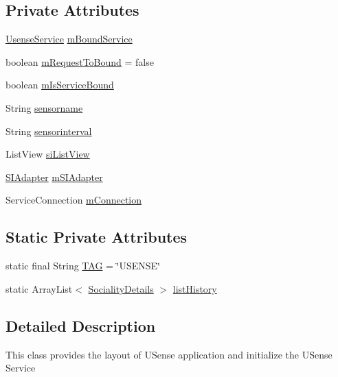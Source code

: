 \subsection*{Private Attributes}
\begin{DoxyCompactItemize}
\item 
\hyperlink{classcs_1_1usense_1_1_usense_service}{Usense\+Service} \hyperlink{classcs_1_1usense_1_1_usense_activity_a85e4dfec4eebe7691d68175af0a102d7}{m\+Bound\+Service}
\item 
boolean \hyperlink{classcs_1_1usense_1_1_usense_activity_a752b7a320a71b54860083dcf3fa53ea2}{m\+Request\+To\+Bound} = false
\item 
boolean \hyperlink{classcs_1_1usense_1_1_usense_activity_afe23746678829a04aa6c82f7d8d6fa71}{m\+Is\+Service\+Bound}
\item 
String \hyperlink{classcs_1_1usense_1_1_usense_activity_a2a4b08f436f712dc28f9be7b02bf62e4}{sensorname}
\item 
String \hyperlink{classcs_1_1usense_1_1_usense_activity_a6e91a30c9cc22d7e63b4c0cbe68b3ee1}{sensorinterval}
\item 
List\+View \hyperlink{classcs_1_1usense_1_1_usense_activity_ad987a28aca979b8dddd792a94372ddae}{si\+List\+View}
\item 
\hyperlink{classcs_1_1usense_1_1_s_i_adapter}{S\+I\+Adapter} \hyperlink{classcs_1_1usense_1_1_usense_activity_a079434ad4693107f055651047a0dc9c8}{m\+S\+I\+Adapter}
\item 
Service\+Connection \hyperlink{classcs_1_1usense_1_1_usense_activity_ae27ad214010eea791ca67b2eff246e56}{m\+Connection}
\end{DoxyCompactItemize}
\subsection*{Static Private Attributes}
\begin{DoxyCompactItemize}
\item 
static final String \hyperlink{classcs_1_1usense_1_1_usense_activity_a9a9e8dd0e952822c0ba0f4f210e7bc4c}{T\+A\+G} = \char`\"{}U\+S\+E\+N\+S\+E\char`\"{}
\item 
static Array\+List$<$ \hyperlink{classcs_1_1usense_1_1inference_module_1_1_sociality_details}{Sociality\+Details} $>$ \hyperlink{classcs_1_1usense_1_1_usense_activity_a8597fab47ee590ad4420ad0a77aaaa24}{list\+History}
\end{DoxyCompactItemize}


\subsection{Detailed Description}
This class provides the layout of U\+Sense application and initialize the U\+Sense Service 

